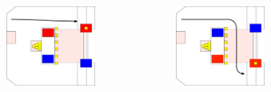 \documentclass{beamer}
\begin{document}
\begin{frame}
\begin{columns}
\begin{figure}
  \end{figure}
  \begin{figure}
   \includegraphics[scale=0.15]{assets/paths/14_LL}
  \end{figure}
  \begin{figure}
   \includegraphics[scale=0.15]{assets/paths/14_RR}
  \end{figure}
 \end{columns}
\end{frame}
\end{document}
